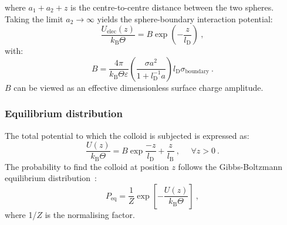 where $a_1+a_2+z$ is the centre-to-centre distance between the two spheres. Taking the limit $a_2\to\infty$ yields the sphere-boundary interaction potential:
\begin{equation}
\dfrac{U_\mathrm{elec}(z)}{k_\mathrm{B}\Theta} = B \exp\left(-\dfrac{z}{l_\mathrm{D}}\right)~,
\label{sphere_boundary_interaction}
\end{equation}
with:
\begin{equation}
    B = \dfrac{4 \pi}{k_\mathrm{B} \Theta \varepsilon}
    \left( \dfrac{\sigma a^2}{1 + l_\mathrm{D}^{-1} a}\right) 
    l_\mathrm{D} \sigma_\mathrm{boundary}~.
\end{equation}
$B$ can be viewed as an effective dimensionless surface charge amplitude.


\subsubsection{Equilibrium distribution}
The total potential to which the colloid is subjected is expressed as:
\begin{equation}
    \dfrac{U(z)}{k_\mathrm{B} \Theta} = B \exp \dfrac{-z}{l_\mathrm{D}} + \dfrac{z}{l_\mathrm{B}}~, ~~~~~~\forall z>0~.
    \label{total_potential_renormalised}
\end{equation}
The probability to find the colloid at position $z$ follows the Gibbs-Boltzmann equilibrium distribution~\cite{Boltzmann1896}:
\begin{equation}
    P_\mathrm{eq} = \dfrac{1}{Z} \exp \left[ - \dfrac{U(z)}{k_\mathrm{B} \Theta} \right]~,
\end{equation}
where 1/$Z$ is the normalising factor.


